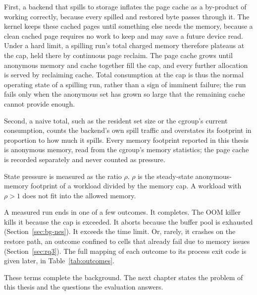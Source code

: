 First, a backend that spills to storage inflates the page cache as a by-product of working correctly, because every spilled and restored byte passes through it.
The kernel keeps these cached pages until something else needs the memory, because a clean cached page requires no work to keep and may save a future device read.
Under a hard limit, a spilling run's total charged memory therefore plateaus at the cap, held there by continuous page reclaim.
The page cache grows until anonymous memory and cache together fill the cap, and every further allocation is served by reclaiming cache.
Total consumption at the cap is thus the normal operating state of a spilling run, rather than a sign of imminent failure; the run fails only when the anonymous set has grown so large that the remaining cache cannot provide enough.

Second, a naive total, such as the resident set size or the cgroup's current consumption, counts the backend's own spill traffic and overstates its footprint in proportion to how much it spills.
Every memory footprint reported in this thesis is anonymous memory, read from the cgroup's memory statistics; the page cache is recorded separately and never counted as pressure.

State pressure is measured as the ratio $\rho$.
$\rho$ is the steady-state anonymous-memory footprint of a workload divided by the memory cap.
A workload with $\rho > 1$ does not fit into the allowed memory.

A measured run ends in one of a few outcomes.
It completes.
The OOM killer kills it because the cap is exceeded.
It aborts because the buffer pool is exhausted (Section~\ref{sec:bg-nes}).
It exceeds the time limit.
Or, rarely, it crashes on the restore path, an outcome confined to cells that already fail due to memory issues (Section~\ref{sec:rq3}).
The full mapping of each outcome to its process exit code is given later, in Table~\ref{tab:outcomes}.


These terms complete the background.
The next chapter states the problem of this thesis and the questions the evaluation answers.
